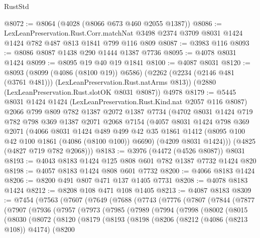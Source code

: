 \begin{lexlean}{RustStd}
\begin{coremodule}
@8072 := @8064 (@4028 (@8066 @673 @460 @2055 @1387))
@8086 := LexLeanPreservation.Rust.Corr.matchNat
    @3498
    @2374
    @3709
    @8031
    @1424
    @1424
    @782
    @487
    @813
    @1841
    @799
    @116
    @809
@8087 := @3983 @116
@8093 := @8086 @8087 @1438 @290 @1444 @1387 @7736
@8095 := @4078 @8031 @1424
@8099 := @8095 @19 @40 @19 @1841
@8100 := @4087 @8031
@8120 := @8093
    (@8099 (@4086 (@8100 @19)) @6586)
    (@2262 (@2234 (@2146 @481 (@3761 @481))) (LexLeanPreservation.Rust.natArms @813))
    (@2880 (LexLeanPreservation.Rust.slotOK @8031 @8087))
    @4978
@8179 := @5445
    @8031
    @1424
    @1424
    (LexLeanPreservation.Rust.Kind.nat @2057 @116 @8087)
    @2066
    @799
    @809
    @782
    @1387
    @2072
    @1387
    @7734
    (@4702
      @8031
      @1424
      @719
      @782
      @798
      @369
      @1387
      @2071
      @2068
      @7154
      (@4057
        @8031
        @1424
        @798
        @369
        @2071
        (@4066
          @8031
          @1424
          @489
          @499
          @42
          @35
          @1861
          @1412
          (@8095 @100 @42 @100 @1861 (@4086 (@8100 @100)) @6690)
          (@4209 @8031 @1424)))
      (@4825 (@4827 @719 @782 @2068)))
@8183 := @3976 (@4472 (@4526 @8087)) @8031
@8193 := @4043 @8183 @1424 @125 @808 @601 @782 @1387 @7732 @1424 @820
@8198 := @4057 @8183 @1424 @808 @601 @7732
@8200 := @4066 @8183 @1424
@8206 := @8200 @491 @807 @471 @137 @1405 @7731
@8208 := @4078 @8183 @1424
@8212 := @8208 @108 @471 @108 @1405
@8213 := @4087 @8183
@8309 := @7454
    (@7563
      (@7607
        (@7649
          (@7688
            (@7743
              (@7776
                (@7807
                  (@7844
                    (@7877
                      (@7907
                        (@7936
                          (@7957
                            (@7973
                              (@7985
                                (@7989
                                  (@7994
                                    (@7998
                                      (@8002
                                        (@8015
                                          (@8030
                                            (@8072
                                              (@8120
                                                (@8179
                                                  (@8193
                                                    (@8198
                                                      (@8206
                                                        (@8212 (@4086 (@8213 @108)) @4174)
                                                        (@8200

\end{coremodule}
\end{lexlean}
